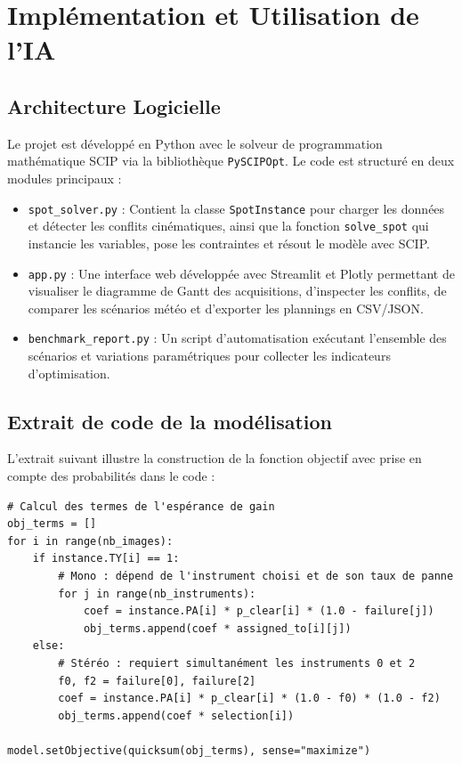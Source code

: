 \section{Implémentation et Utilisation de l'IA}

\subsection{Architecture Logicielle}
Le projet est développé en Python avec le solveur de programmation mathématique SCIP via la bibliothèque \texttt{PySCIPOpt}. Le code est structuré en deux modules principaux :
\begin{itemize}
    \item \texttt{spot\_solver.py} : Contient la classe \texttt{SpotInstance} pour charger les données et détecter les conflits cinématiques, ainsi que la fonction \texttt{solve\_spot} qui instancie les variables, pose les contraintes et résout le modèle avec SCIP.
    \item \texttt{app.py} : Une interface web développée avec Streamlit et Plotly permettant de visualiser le diagramme de Gantt des acquisitions, d'inspecter les conflits, de comparer les scénarios météo et d'exporter les plannings en CSV/JSON.
    \item \texttt{benchmark\_report.py} : Un script d'automatisation exécutant l'ensemble des scénarios et variations paramétriques pour collecter les indicateurs d'optimisation.
\end{itemize}

\subsection{Extrait de code de la modélisation}
L'extrait suivant illustre la construction de la fonction objectif avec prise en compte des probabilités dans le code :

\begin{verbatim}
# Calcul des termes de l'espérance de gain
obj_terms = []
for i in range(nb_images):
    if instance.TY[i] == 1:
        # Mono : dépend de l'instrument choisi et de son taux de panne
        for j in range(nb_instruments):
            coef = instance.PA[i] * p_clear[i] * (1.0 - failure[j])
            obj_terms.append(coef * assigned_to[i][j])
    else:
        # Stéréo : requiert simultanément les instruments 0 et 2
        f0, f2 = failure[0], failure[2]
        coef = instance.PA[i] * p_clear[i] * (1.0 - f0) * (1.0 - f2)
        obj_terms.append(coef * selection[i])

model.setObjective(quicksum(obj_terms), sense="maximize")
\end{verbatim}

